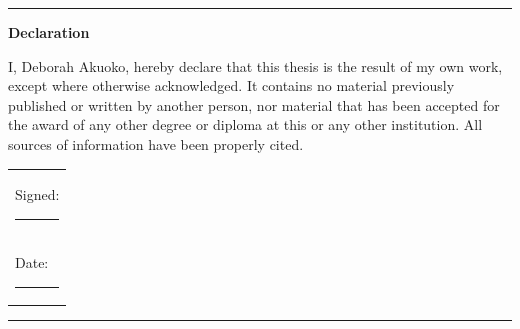 \documentclass[12pt,a4paper,oneside]{report}
\begin{document}
\setcounter{page}{1}
\newpage
\thispagestyle{empty}
\vspace*{-1.5cm}
\hfill\textcolor{gray}{\textit{}}
\vspace{0.2cm}
\noindent\rule{\textwidth}{0.5pt}
\vspace{1cm}
{\fontsize{12pt}{18pt}\selectfont
{\fontsize{14pt}{21pt}\selectfont\textbf{Declaration}}

I, Deborah Akuoko, hereby declare that this thesis is the result of my own work, except where otherwise acknowledged. It contains no material previously published or written by another person, nor material that has been accepted for the award of any other degree or diploma at this or any other institution. All sources of information have been properly cited.

\vspace{1cm}
\begin{tabular}{@{}l@{}}
Signed: \rule{8cm}{0.4pt} \\
Date: \rule{8cm}{0.4pt} \\
\end{tabular}
}
\vspace*{\fill}
\newpage
\thispagestyle{empty}
\vspace*{-1.5cm}
\hfill\textcolor{gray}{\textit{}}
\vspace{0.2cm}
\noindent\rule{\textwidth}{0.5pt}
\vspace{0.5cm}
\end{document}
